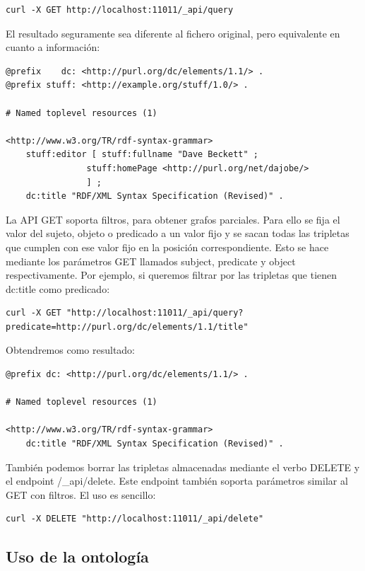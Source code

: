 \documentclass[12pt]{report} %
\begin{document}
\begin{verbatim}
curl -X GET http://localhost:11011/_api/query
\end{verbatim}

El resultado seguramente sea diferente al fichero original, pero equivalente en cuanto a información:
\begin{verbatim}                                                 
@prefix    dc: <http://purl.org/dc/elements/1.1/> .
@prefix stuff: <http://example.org/stuff/1.0/> .

# Named toplevel resources (1)

<http://www.w3.org/TR/rdf-syntax-grammar>
    stuff:editor [ stuff:fullname "Dave Beckett" ;
                stuff:homePage <http://purl.org/net/dajobe/>
                ] ;
    dc:title "RDF/XML Syntax Specification (Revised)" .
\end{verbatim}

La API GET soporta filtros, para obtener grafos parciales. Para ello se fija el valor del sujeto, objeto o predicado a un valor fijo y se sacan todas las tripletas que cumplen con ese valor fijo en la posición correspondiente. Esto se hace mediante los parámetros GET llamados subject, predicate y object respectivamente. Por ejemplo, si queremos filtrar por las tripletas que tienen dc:title como predicado:

\begin{verbatim}
curl -X GET "http://localhost:11011/_api/query?predicate=http://purl.org/dc/elements/1.1/title"
\end{verbatim}

Obtendremos como resultado:
\begin{verbatim}
@prefix dc: <http://purl.org/dc/elements/1.1/> .

# Named toplevel resources (1)

<http://www.w3.org/TR/rdf-syntax-grammar>
    dc:title "RDF/XML Syntax Specification (Revised)" .
\end{verbatim}

También podemos borrar las tripletas almacenadas mediante el verbo DELETE y el endpoint /\_api/delete. Este endpoint también soporta parámetros similar al GET con filtros. El uso es sencillo:

\begin{verbatim}
curl -X DELETE "http://localhost:11011/_api/delete"
\end{verbatim}

\subsection{Uso de la ontología}
\end{document}
